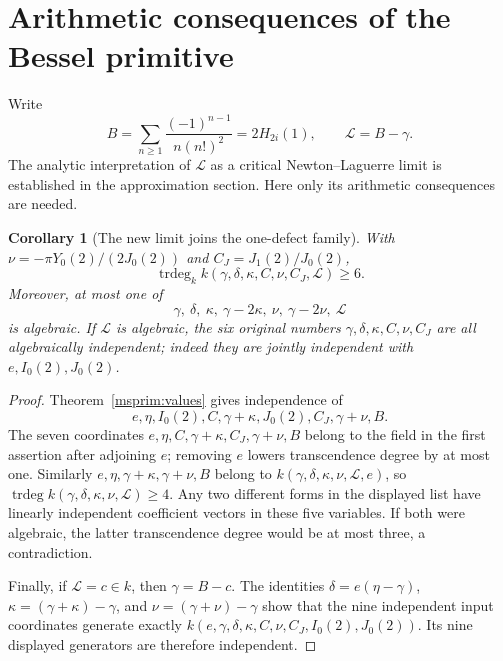\documentclass[11pt]{article}
\newtheorem{corollary}[theorem]{Corollary}
\theoremstyle{definition}
\theoremstyle{remark}
\begin{document}
\section{Arithmetic consequences of the Bessel primitive}
Write
\[
 B=\sum_{n\ge1}\frac{(-1)^{n-1}}{n(n!)^2}=2H_{2i}(1),
 \qquad \mathcal L=B-\gamma.
\]
The analytic interpretation of $\mathcal L$ as a critical
Newton--Laguerre limit is established in the approximation section.
Here only its arithmetic consequences are needed.

\begin{corollary}[The new limit joins the one-defect family]
\label{prim:rank}
With $\nu=-\pi Y_0(2)/(2J_0(2))$ and $C_J=J_1(2)/J_0(2)$,
\[
 \operatorname{trdeg}_{k}
 k(\gamma,\delta,\kappa,C,\nu,C_J,\mathcal L)\ge6.
\]
Moreover, at most one of
\[
 \gamma,\ \delta,\ \kappa,\ \gamma-2\kappa,\
 \nu,\ \gamma-2\nu,\ \mathcal L
\]
is algebraic. If $\mathcal L$ is algebraic, the six original numbers
$\gamma,\delta,\kappa,C,\nu,C_J$ are all algebraically independent;
indeed they are jointly independent with $e,I_0(2),J_0(2)$.
\end{corollary}
\begin{proof}
Theorem~\ref{msprim:values} gives independence of
\[
 e,\eta,I_0(2),C,\gamma+\kappa,
 J_0(2),C_J,\gamma+\nu,B.
\]
The seven coordinates $e,\eta,C,\gamma+\kappa,C_J,\gamma+\nu,B$
belong to the field in the first assertion after adjoining $e$;
removing $e$ lowers transcendence degree by at most one.
Similarly $e,\eta,\gamma+\kappa,\gamma+\nu,B$ belong to
$k(\gamma,\delta,\kappa,\nu,\mathcal L,e)$, so
$\operatorname{trdeg} k(\gamma,\delta,\kappa,\nu,\mathcal L)\ge4$.
Any two different forms in the displayed list have linearly
independent coefficient vectors in these five variables. If both
were algebraic, the latter transcendence degree would be at most
three, a contradiction.

Finally, if $\mathcal L=c\in k$, then $\gamma=B-c$.
The identities $\delta=e(\eta-\gamma)$,
$\kappa=(\gamma+\kappa)-\gamma$, and
$\nu=(\gamma+\nu)-\gamma$ show that the nine independent input
coordinates generate exactly
$k(e,\gamma,\delta,\kappa,C,\nu,C_J,I_0(2),J_0(2))$.
Its nine displayed generators are therefore independent.
\end{proof}
\end{document}
